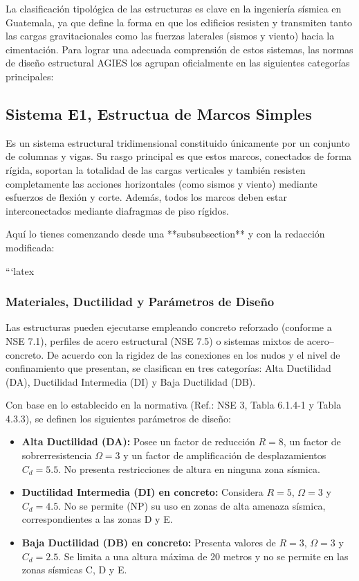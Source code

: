 \documentclass[14pt,letterpaper]{extarticle}
\begin{document}
	
	La clasificación tipológica de las estructuras es clave en la ingeniería sísmica en Guatemala, ya que define la forma en que los edificios resisten y transmiten tanto las cargas gravitacionales como las fuerzas laterales (sismos y viento) hacia la cimentación. Para lograr una adecuada comprensión de estos sistemas, las normas de diseño estructural AGIES los agrupan oficialmente en las siguientes categorías principales:
	
	\subsection{Sistema E1, Estructua de Marcos Simples }
	
	
	
	Es un sistema estructural tridimensional constituido únicamente por un conjunto de columnas y vigas. Su rasgo principal es que estos marcos, conectados de forma rígida, soportan la totalidad de las cargas verticales y también resisten completamente las acciones horizontales (como sismos y viento) mediante esfuerzos de flexión y corte. Además, todos los marcos deben estar interconectados mediante diafragmas de piso rígidos.
	

	Aquí lo tienes comenzando desde una **subsubsection** y con la redacción modificada:
	
	```latex
	\subsubsection{Materiales, Ductilidad y Parámetros de Diseño}
	
	Las estructuras pueden ejecutarse empleando concreto reforzado (conforme a NSE 7.1), perfiles de acero estructural (NSE 7.5) o sistemas mixtos de acero–concreto. De acuerdo con la rigidez de las conexiones en los nudos y el nivel de confinamiento que presentan, se clasifican en tres categorías: Alta Ductilidad (DA), Ductilidad Intermedia (DI) y Baja Ductilidad (DB).
	
	Con base en lo establecido en la normativa (Ref.: NSE 3, Tabla 6.1.4-1 y Tabla 4.3.3), se definen los siguientes parámetros de diseño:
	
	\begin{itemize}
		\item \textbf{Alta Ductilidad (DA):} Posee un factor de reducción $R = 8$, un factor de sobrerresistencia $\Omega = 3$ y un factor de amplificación de desplazamientos $C_d = 5.5$. No presenta restricciones de altura en ninguna zona sísmica.
		
		\item \textbf{Ductilidad Intermedia (DI) en concreto:} Considera $R = 5$, $\Omega = 3$ y $C_d = 4.5$. No se permite (NP) su uso en zonas de alta amenaza sísmica, correspondientes a las zonas D y E.
		
		\item \textbf{Baja Ductilidad (DB) en concreto:} Presenta valores de $R = 3$, $\Omega = 3$ y $C_d = 2.5$. Se limita a una altura máxima de 20 metros y no se permite en las zonas sísmicas C, D y E.
	\end{itemize}
	
\end{document}
